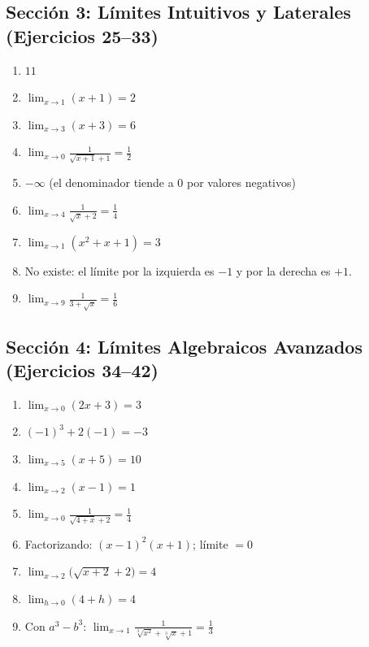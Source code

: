 \documentclass[12pt, letterpaper]{article}
\begin{document}
  \subsection*{Sección 3: Límites Intuitivos y Laterales (Ejercicios 25--33)}
  \begin{enumerate}[resume=respuestas, leftmargin=*, label=\textbf{\arabic*.}]
    \item $11$
    \item $\displaystyle\lim_{x \to 1} (x + 1) = 2$
    \item $\displaystyle\lim_{x \to 3} (x + 3) = 6$
    \item $\displaystyle\lim_{x \to 0} \frac{1}{\sqrt{x + 1} + 1} = \frac{1}{2}$
    \item $-\infty$ (el denominador tiende a 0 por valores negativos)
    \item $\displaystyle\lim_{x \to 4} \frac{1}{\sqrt{x} + 2} = \frac{1}{4}$
    \item $\displaystyle\lim_{x \to 1} (x^2 + x + 1) = 3$
    \item No existe: el límite por la izquierda es $-1$ y por la derecha es $+1$.
    \item $\displaystyle\lim_{x \to 9} \frac{1}{3 + \sqrt{x}} = \frac{1}{6}$
  \end{enumerate}

  \subsection*{Sección 4: Límites Algebraicos Avanzados (Ejercicios 34--42)}
  \begin{enumerate}[resume=respuestas, leftmargin=*, label=\textbf{\arabic*.}]
    \item $\displaystyle\lim_{x \to 0} (2x + 3) = 3$
    \item $(-1)^3 + 2(-1) = -3$
    \item $\displaystyle\lim_{x \to 5} (x + 5) = 10$
    \item $\displaystyle\lim_{x \to 2} (x - 1) = 1$
    \item $\displaystyle\lim_{x \to 0} \frac{1}{\sqrt{4 + x} + 2} = \frac{1}{4}$
    \item Factorizando: $(x - 1)^2 (x + 1)$; límite $= 0$
    \item $\displaystyle\lim_{x \to 2} \big(\sqrt{x + 2} + 2\big) = 4$
    \item $\displaystyle\lim_{h \to 0} (4 + h) = 4$
    \item Con $a^3 - b^3$: $\displaystyle\lim_{x \to 1} \frac{1}{\sqrt[3]{x^2} + \sqrt[3]{x} + 1} = \frac{1}{3}$
  \end{enumerate}
\end{document}
